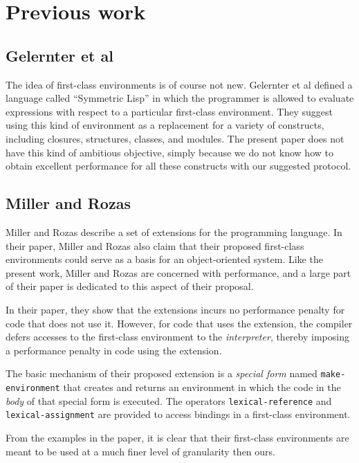 \section{Previous work}

\subsection{Gelernter et al}

The idea of first-class environments is of course not new.
Gelernter et al \cite{Gelernter:1987:EFC:41625.41634} defined a
language called ``Symmetric Lisp'' in which the programmer is allowed
to evaluate expressions with respect to a particular first-class
environment.  They suggest using this kind of environment as a
replacement for a variety of constructs, including closures,
structures, classes, and modules.  The present paper does not have
this kind of ambitious objective, simply because we do not know how to
obtain excellent performance for all these constructs with our
suggested protocol.

\subsection{Miller and Rozas}

Miller and Rozas \cite{Miller:1991:FVF:113825.113826} describe a set
of extensions for the \scheme{} programming language.  In their paper,
Miller and Rozas also claim that their proposed first-class
environments could serve as a basis for an object-oriented system.
Like the present work, Miller and Rozas are concerned with
performance, and a large part of their paper is dedicated to this
aspect of their proposal.

In their paper, they show that the extensions incurs no performance
penalty for code that does not use it.  However, for code that uses
the extension, the compiler defers accesses to the first-class
environment to the \emph{interpreter}, thereby imposing a performance
penalty in code using the extension.

The basic mechanism of their proposed extension is a \emph{special
  form} named \texttt{make-environment} that creates and returns an
environment in which the code in the \emph{body} of that special form
is executed.  The operators \texttt{lexical-reference} and
\texttt{lexical-assignment} are provided to access bindings in a
first-class environment.

From the examples in the paper, it is clear that their first-class
environments are meant to be used at a much finer level of granularity
then ours.

